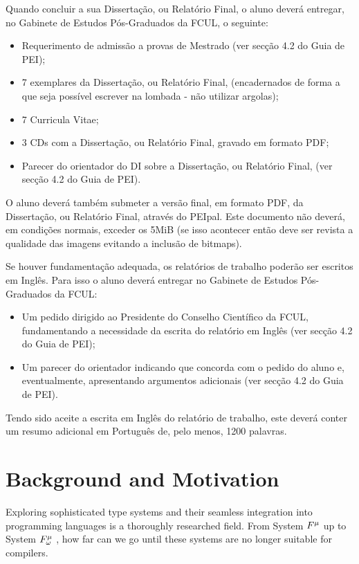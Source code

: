 Quando concluir a sua Dissertação, ou Relatório Final, o aluno deverá entregar, no Gabinete de Estudos Pós-Graduados da FCUL, o seguinte:

\begin{itemize}
\item Requerimento de admissão a provas de Mestrado (ver secção 4.2 do Guia de PEI);
\item 7 exemplares da Dissertação, ou Relatório Final, (encadernados de forma a que seja possível escrever na lombada - não utilizar argolas);
\item 7 Curricula Vitae;
\item 3 CDs com a Dissertação, ou Relatório Final, gravado em formato PDF;
\item Parecer do orientador do DI sobre a Dissertação, ou Relatório Final, (ver secção 4.2 do Guia de PEI).
\end{itemize}

O aluno deverá também submeter a versão final, em formato PDF, da Dissertação, ou Relatório Final, através do PEIpal. Este documento não deverá, em condições normais, exceder os 5MiB (se isso acontecer então deve ser revista a qualidade das imagens evitando a inclusão de bitmaps).

Se houver fundamentação adequada, os relatórios de trabalho poderão ser escritos em Inglês. Para isso o aluno deverá entregar no Gabinete de Estudos Pós-Graduados da FCUL:

\begin{itemize}
\item Um pedido dirigido ao Presidente do Conselho Científico da FCUL, fundamentando a necessidade da escrita do relatório em Inglês (ver secção 4.2 do Guia de PEI);
\item Um parecer do orientador indicando que concorda com o pedido do aluno e, eventualmente, apresentando argumentos adicionais (ver secção 4.2 do Guia de PEI).
\end{itemize}

Tendo sido aceite a escrita em Inglês do relatório de trabalho, este deverá conter um resumo adicional em Português de, pelo menos, 1200 palavras.

\section{Background and Motivation}
Exploring sophisticated type systems and their seamless integration into programming languages is a thoroughly researched field. From System $F^{\mu}$ \cite{GauthierP04} up to System $F^{\mu}_\omega$ \cite{DBLP:conf/popl/CaiGO16}, how far can we go until these systems are no longer suitable for compilers.

